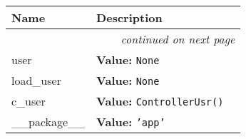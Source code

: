     \vspace{-1cm}
\hspace{\varindent}\begin{longtable}{|p{\varnamewidth}|p{\vardescrwidth}|l}
\cline{1-2}
\cline{1-2} \centering \textbf{Name} & \centering \textbf{Description}& \\
\cline{1-2}
\endhead\cline{1-2}\multicolumn{3}{r}{\small\textit{continued on next page}}\\\endfoot\cline{1-2}
\endlastfoot\raggedright u\-s\-e\-r\-1\- & \raggedright \textbf{Value:} 
{\tt None}&\\
\cline{1-2}
\raggedright l\-o\-a\-d\-\_\-u\-s\-e\-r\- & \raggedright \textbf{Value:} 
{\tt None}&\\
\cline{1-2}
\raggedright c\-\_\-u\-s\-e\-r\- & \raggedright \textbf{Value:} 
{\tt ControllerUsr()}&\\
\cline{1-2}
\raggedright \_\-\_\-p\-a\-c\-k\-a\-g\-e\-\_\-\_\- & \raggedright \textbf{Value:} 
{\tt \texttt{'}\texttt{app}\texttt{'}}&\\
\cline{1-2}
\end{longtable}

